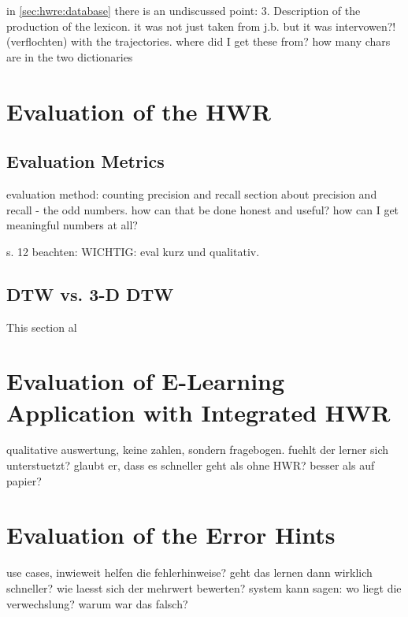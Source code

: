 in \ref{sec:hwre:database} there is an undiscussed point:
   3. Description of the production of the lexicon.
      it was not just taken from j.b. but it was intervowen?! (verflochten) 
      with the trajectories. where did I get these from? 
      how many chars are in the two dictionaries


\section{Evaluation of the HWR}
\subsection{ Evaluation Metrics }
evaluation method: counting precision and recall
section about precision and recall - the odd numbers.
how can that be done honest and useful?
how can I get meaningful numbers at all?

s. 12 beachten: WICHTIG: eval kurz und qualitativ.

\subsection{DTW vs. 3-D DTW}
\label{sec:impl:dtwvs3ddtw} %
This section al

\section{Evaluation of E-Learning Application with Integrated HWR}
qualitative auswertung, keine zahlen, sondern fragebogen.
fuehlt der lerner sich unterstuetzt? glaubt er, dass es schneller geht als ohne 
HWR? 
besser als auf papier?

\section{Evaluation of the Error Hints}
use cases, inwieweit helfen die fehlerhinweise?
geht das lernen dann wirklich schneller?
wie laesst sich der mehrwert bewerten?
system kann sagen: wo liegt die verwechslung? warum war das falsch?


